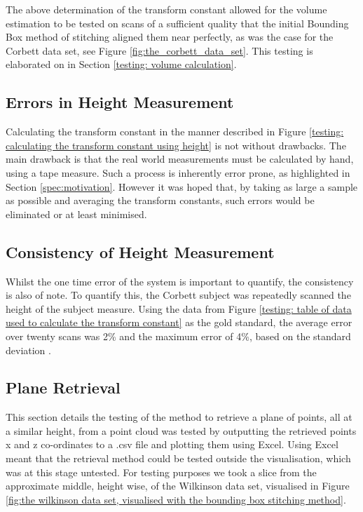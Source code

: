 The above determination of the transform constant allowed for the volume estimation to be tested on scans of a sufficient quality that the initial Bounding Box method of stitching aligned them near perfectly, as was the case for the Corbett data set, see Figure \ref{fig:the_corbett_data_set}. This testing is elaborated on in Section \ref{testing: volume calculation}.\\

\subsection{Errors in Height Measurement}
Calculating the transform constant in the manner described in Figure \ref{testing: calculating the transform constant using height} is not without drawbacks. The main drawback is that the real world measurements must be calculated by hand, using a tape measure. Such a process is inherently error prone, as highlighted in Section \ref{spec:motivation}. However it was hoped that, by taking as large a sample as possible and averaging the transform constants, such errors would be eliminated or at least minimised.\\

\subsection{Consistency of Height Measurement}
Whilst the one time error of the system is important to quantify, the consistency is also of note. To quantify this, the Corbett subject was repeatedly scanned the height of the subject measure. Using the data from Figure \ref{testing: table of data used to calculate the transform constant} as the gold standard, the average error over twenty scans was 2\% and the maximum error of 4\%, based on the standard deviation \cite{pukelsheim1994}.\\

\subsection{Plane Retrieval}
This section details the testing of the method to retrieve a plane of points, all at a similar height, from a point cloud was tested by outputting the retrieved points x and z co-ordinates to a .csv file and plotting them using Excel. Using Excel meant that the retrieval method could be tested outside the visualisation, which was at this stage untested. For testing purposes we took a slice from the approximate middle, height wise, of the Wilkinson data set, visualised in Figure \ref{fig:the wilkinson data set, visualised with the bounding box stitching method}.\\

